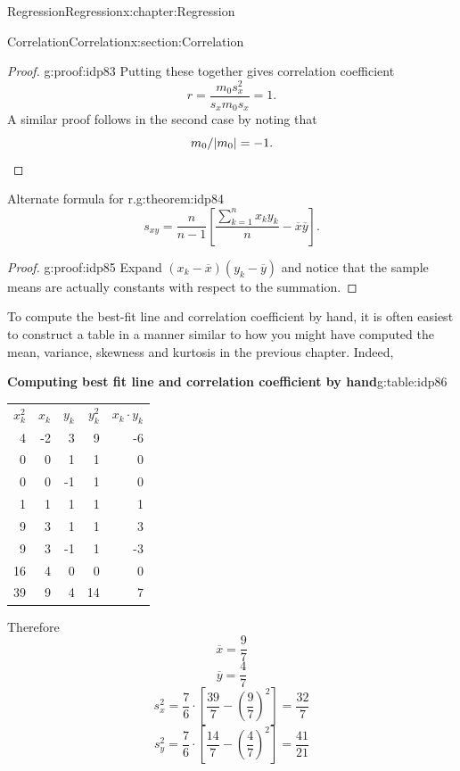 \documentclass[oneside,10pt,]{book}
\newcommand{\tabularfont}{\relax}
\newcommand{\qedhere}{\relax}
\numberwithin{equation}{section}
\newcommand{\hrulemedium}{\noalign{\hrule height 0.07em}}
\begin{document}
\begin{chapterptx}{Regression}{}{Regression}{}{}{x:chapter:Regression}
\begin{sectionptx}{Correlation}{}{Correlation}{}{}{x:section:Correlation}
\begin{proof}{}{g:proof:idp83}
Putting these together gives correlation coefficient%
\begin{equation*}
r = \frac{m_0 s_x^2}{s_x m_0 s_x} = 1.
\end{equation*}
A similar proof follows in the second case by noting that%
\begin{equation*}
m_0 / | m_0 | = -1.\qedhere
\end{equation*}
%
\end{proof}
\begin{theorem}{Alternate formula for r.}{}{g:theorem:idp84}%
%
\begin{equation*}
s_{xy} = \frac{n}{n-1} \left [ \frac{\sum_{k=1}^n x_k y_k}{n} - \overline{x} \overline{y} \right ].
\end{equation*}
%
\end{theorem}
\begin{proof}{}{g:proof:idp85}
Expand \((x_k-\overline{x})(y_k-\overline{y})\) and notice that the sample means are actually constants with respect to the summation.%
\end{proof}
To compute the best-fit line and correlation coefficient by hand, it is often easiest to construct a table in a manner similar to how you might have computed the mean, variance, skewness and kurtosis in the previous chapter.  Indeed, \begin{tableptx}{\textbf{Computing best fit line and correlation coefficient by hand}}{g:table:idp86}{}%
\centering
{\tabularfont%
\begin{tabular}{rrrrr}
\(x_k^2\)&\(x_k\)&\(y_k\)&\(y_k^2\)&\(x_k \cdot y_k\)\tabularnewline\hrulemedium
4&-2&3&9&-6\tabularnewline[0pt]
0&0&1&1&0\tabularnewline[0pt]
0&0&-1&1&0\tabularnewline[0pt]
1&1&1&1&1\tabularnewline[0pt]
9&3&1&1&3\tabularnewline[0pt]
9&3&-1&1&-3\tabularnewline[0pt]
16&4&0&0&0\tabularnewline\hrulemedium
39&9&4&14&7
\end{tabular}
}%
\end{tableptx}%
 Therefore%
\begin{equation*}
\overline{x} = \frac{9}{7}
\end{equation*}
%
\begin{equation*}
\overline{y} = \frac{4}{7}
\end{equation*}
%
\begin{equation*}
s_x^2 = \frac{7}{6} \cdot \left [ \frac{39}{7} - \left ( \frac{9}{7} \right )^2 \right ] = \frac{32}{7}
\end{equation*}
%
\begin{equation*}
s_y^2 = \frac{7}{6} \cdot \left [ \frac{14}{7} - \left ( \frac{4}{7} \right )^2 \right ] = \frac{41}{21}

\end{equation*}
\end{sectionptx}
\end{chapterptx}
\end{document}
